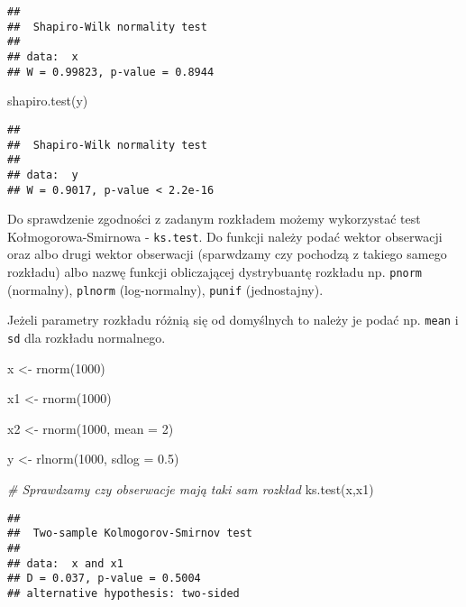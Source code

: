 \documentclass[
]{book}
\newenvironment{Shaded}{\begin{snugshade}}{\end{snugshade}}
\newcommand{\AttributeTok}[1]{\textcolor[rgb]{0.77,0.63,0.00}{#1}}
\newcommand{\CommentTok}[1]{\textcolor[rgb]{0.56,0.35,0.01}{\textit{#1}}}
\newcommand{\DecValTok}[1]{\textcolor[rgb]{0.00,0.00,0.81}{#1}}
\newcommand{\FloatTok}[1]{\textcolor[rgb]{0.00,0.00,0.81}{#1}}
\newcommand{\FunctionTok}[1]{\textcolor[rgb]{0.00,0.00,0.00}{#1}}
\newcommand{\NormalTok}[1]{#1}
\newcommand{\OtherTok}[1]{\textcolor[rgb]{0.56,0.35,0.01}{#1}}
\begin{document}
\begin{verbatim}
## 
##  Shapiro-Wilk normality test
## 
## data:  x
## W = 0.99823, p-value = 0.8944
\end{verbatim}

\begin{Shaded}
\begin{Highlighting}[]
\FunctionTok{shapiro.test}\NormalTok{(y)}
\end{Highlighting}
\end{Shaded}

\begin{verbatim}
## 
##  Shapiro-Wilk normality test
## 
## data:  y
## W = 0.9017, p-value < 2.2e-16
\end{verbatim}

Do sprawdzenie zgodności z zadanym rozkładem możemy wykorzystać test Kołmogorowa-Smirnowa - \texttt{ks.test}. Do funkcji należy podać wektor obserwacji oraz albo drugi wektor obserwacji (sparwdzamy czy pochodzą z takiego samego rozkładu) albo nazwę funkcji obliczającej dystrybuantę rozkładu np. \texttt{pnorm} (normalny), \texttt{plnorm} (log-normalny), \texttt{punif} (jednostajny).

Jeżeli parametry rozkładu różnią się od domyślnych to należy je podać np. \texttt{mean} i \texttt{sd} dla rozkładu normalnego.

\begin{Shaded}
\begin{Highlighting}[]
\NormalTok{x }\OtherTok{\textless{}{-}} \FunctionTok{rnorm}\NormalTok{(}\DecValTok{1000}\NormalTok{)}

\NormalTok{x1 }\OtherTok{\textless{}{-}} \FunctionTok{rnorm}\NormalTok{(}\DecValTok{1000}\NormalTok{)}

\NormalTok{x2 }\OtherTok{\textless{}{-}} \FunctionTok{rnorm}\NormalTok{(}\DecValTok{1000}\NormalTok{, }\AttributeTok{mean =} \DecValTok{2}\NormalTok{)}

\NormalTok{y }\OtherTok{\textless{}{-}} \FunctionTok{rlnorm}\NormalTok{(}\DecValTok{1000}\NormalTok{, }\AttributeTok{sdlog =} \FloatTok{0.5}\NormalTok{)}

\CommentTok{\# Sprawdzamy czy obserwacje mają taki sam rozkład}
\FunctionTok{ks.test}\NormalTok{(x,x1)}
\end{Highlighting}
\end{Shaded}

\begin{verbatim}
## 
##  Two-sample Kolmogorov-Smirnov test
## 
## data:  x and x1
## D = 0.037, p-value = 0.5004
## alternative hypothesis: two-sided
\end{verbatim}
\end{document}
